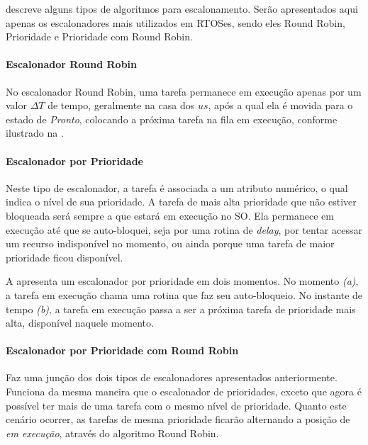  descreve alguns tipos de algoritmos para escalonamento. Serão apresentados aqui apenas os escalonadores mais utilizados em RTOSes, sendo eles Round Robin, Prioridade e Prioridade com Round Robin.

\paragraph{Escalonador Round Robin}

No escalonador Round Robin, uma tarefa permanece em execução apenas por um valor $\Delta T$ de tempo, geralmente na casa dos $us$, após a qual ela é movida para o estado de \emph{Pronto}, colocando a próxima tarefa na fila em execução, conforme ilustrado na .


\paragraph{Escalonador por Prioridade}

Neste tipo de escalonador, a tarefa é associada a um atributo numérico, o qual indica o nível de sua prioridade. A tarefa de mais alta prioridade que não estiver bloqueada será sempre a que estará em execução no SO. Ela permanece em execução até que se auto-bloquei, seja por uma rotina de \emph{delay}, por tentar acessar um recurso indisponível no momento, ou ainda porque uma tarefa de maior prioridade ficou disponível.

A  apresenta um escalonador por prioridade em dois momentos. No momento \emph{(a)}, a tarefa em execução chama uma rotina que faz seu auto-bloqueio. No instante de tempo \emph{(b)}, a tarefa em execução passa a ser a próxima tarefa de prioridade mais alta, disponível naquele momento.


\paragraph{Escalonador por Prioridade com Round Robin}

Faz uma junção dos dois tipos de escalonadores apresentados anteriormente. Funciona da mesma maneira que o escalonador de prioridades, exceto que agora é possível ter mais de uma tarefa com o mesmo nível de prioridade. Quanto este cenário ocorrer, as tarefas de mesma prioridade ficarão alternando a posição de \emph{em execução}, através do algoritmo Round Robin.

